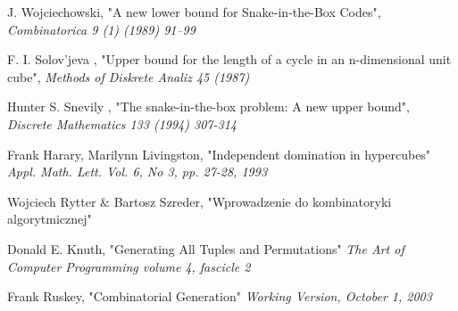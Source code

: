 \documentclass{pracamgr}
\begin{document}
\begin{thebibliography}{99}
   J. Wojciechowski,
   "A new lower bound for Snake-in-the-Box Codes",
   \textit{Combinatorica 9 (1) (1989) 91--99}
  
   F. I. Solov'jeva ,
   "Upper bound for the length of a cycle in an n-dimensional unit cube",
   \textit{Methods of Diskrete Analiz 45 (1987)}

   Hunter S. Snevily ,
   "The snake-in-the-box problem: A new upper bound",
   \textit{Discrete Mathematics 133 (1994) 307-314}
   
   
   
   Frank Harary, Marilynn Livingston,
   "Independent domination in hypercubes"
   \textit{Appl. Math. Lett. Vol. 6, No 3, pp. 27-28, 1993}
   
   Wojciech Rytter $\&$ Bartosz Szreder,
   "Wprowadzenie do kombinatoryki algorytmicznej"
   
   Donald E. Knuth,
   "Generating All Tuples and Permutations"
   \textit{The Art of Computer Programming volume 4, fascicle 2}
  
   Frank Ruskey,
   "Combinatorial Generation"
   \textit{Working Version, October 1, 2003}
   
\end{thebibliography}
\end{document}
